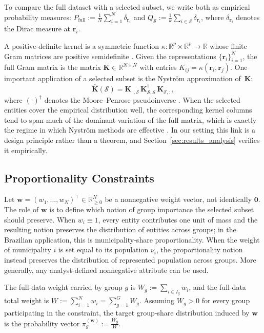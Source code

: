 \documentclass[10pt,journal]{IEEEtran}
\newcommand{\R}{\mathbb{R}}
\newcommand{\1}{\mathbf{1}}
\newcommand{\br}{\mathbf{r}}
\newcommand{\bw}{\mathbf{w}}
\newcommand{\bK}{\mathbf{K}}
\newcommand{\Sel}{\mathcal{S}}
\newcommand{\Full}{\mathrm{full}}
\theoremstyle{ieeethm}
\begin{document}
To compare the full dataset with a selected subset, we write both as empirical probability measures: $P_{\Full}:=\frac{1}{N}\sum_{i=1}^{N}\delta_{\br_i}$ and $Q_{\Sel}:=\frac{1}{k}\sum_{i\in\Sel}\delta_{\br_i}$,
where $\delta_{\br_i}$ denotes the Dirac measure at $\br_i$.

A positive-definite kernel is a symmetric function $\kappa:\R^p\times\R^p\to\R$ whose finite Gram matrices are positive semidefinite \cite{scholkopf2002learning}. Given the representations $\{\br_i\}_{i=1}^N$, the full Gram matrix is the matrix $\bK\in\R^{N\times N}$ with entries $K_{ij}=\kappa(\br_i,\br_j)$. One important application of a selected subset is the Nyström approximation of~$\bK$:
\[
\widehat{\bK}(\Sel)=\bK_{:,\Sel}\,\bK_{\Sel,\Sel}^{\dagger}\,\bK_{\Sel,:},
\]
where $(\cdot)^\dagger$ denotes the Moore--Penrose pseudoinverse \cite{williams2001nystrom,gittens2016nystrom}. When the selected entities cover the empirical distribution well, the corresponding kernel columns tend to span much of the dominant variation of the full matrix, which is exactly the regime in which Nyström methods are effective \cite{williams2001nystrom,gittens2016nystrom}. In our setting this link is a design principle rather than a theorem, and Section~\ref{sec:results_analysis} verifies it empirically.

\subsection{Proportionality Constraints}
\label{subsec:constraints}

Let $\bw=(w_1,\dots,w_N)^\top\in\R_{\ge 0}^N$ be a nonnegative weight vector, not identically $\mathbf{0}$. The role of $\bw$ is to define which notion of group importance the selected subset should preserve. When $w_i\equiv 1$, every entity contributes one unit of mass and the resulting notion preserves the distribution of entities across groups; in the Brazilian application, this is municipality-share proportionality. When the weight of municipality $i$ is set equal to its population $\nu_i$, the proportionality notion instead preserves the distribution of represented population across groups. More generally, any analyst-defined nonnegative attribute can be used.

The full-data weight carried by group $g$ is $W_g:=\sum_{i\in I_g} w_i$, and the full-data total weight is $W:=\sum_{i=1}^{N}w_i=\sum_{g=1}^{G}W_g$. Assuming $W_g>0$ for every group participating in the constraint, the target group-share distribution induced by $\bw$ is the probability vector $\pi_g^{(\bw)}:=\frac{W_g}{W}$.
\end{document}

